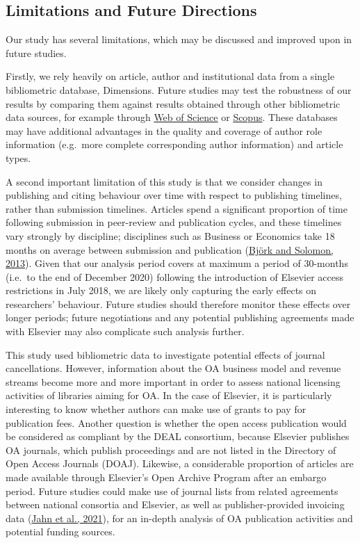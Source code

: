 \documentclass[
]{article}
\begin{document}
\hypertarget{limitations-and-future-directions}{%
\subsection{Limitations and Future Directions}\label{limitations-and-future-directions}}

Our study has several limitations, which may be discussed and improved upon in future studies.

Firstly, we rely heavily on article, author and institutional data from a single bibliometric database, Dimensions. Future studies may test the robustness of our results by comparing them against results obtained through other bibliometric data sources, for example through \href{https://www.webofknowledge.com/}{Web of Science} or \href{https://www.scopus.com}{Scopus}. These databases may have additional advantages in the quality and coverage of author role information (e.g.~more complete corresponding author information) and article types.

A second important limitation of this study is that we consider changes in publishing and citing behaviour over time with respect to publishing timelines, rather than submission timelines. Articles spend a significant proportion of time following submission in peer-review and publication cycles, and these timelines vary strongly by discipline; disciplines such as Business or Economics take 18 months on average between submission and publication (\href{https://doi.org/10.1016/j.joi.2013.09.001}{Björk and Solomon, 2013}). Given that our analysis period covers at maximum a period of 30-months (i.e.~to the end of December 2020) following the introduction of Elsevier access restrictions in July 2018, we are likely only capturing the early effects on researchers' behaviour. Future studies should therefore monitor these effects over longer periods; future negotiations and any potential publishing agreements made with Elsevier may also complicate such analysis further.

This study used bibliometric data to investigate potential effects of journal cancellations. However, information about the OA business model and revenue streams become more and more important in order to assess national licensing activities of libraries aiming for OA. In the case of Elsevier, it is particularly interesting to know whether authors can make use of grants to pay for publication fees. Another question is whether the open access publication would be considered as compliant by the DEAL consortium, because Elsevier publishes OA journals, which publish proceedings and are not listed in the Directory of Open Access Journals (DOAJ). Likewise, a considerable proportion of articles are made available through Elsevier's Open Archive Program after an embargo period. Future studies could make use of journal lists from related agreements between national consortia and Elsevier, as well as publisher-provided invoicing data (\href{http://arxiv.org/abs/2102.04789\%7D}{Jahn et al., 2021}), for an in-depth analysis of OA publication activities and potential funding sources.
\end{document}
